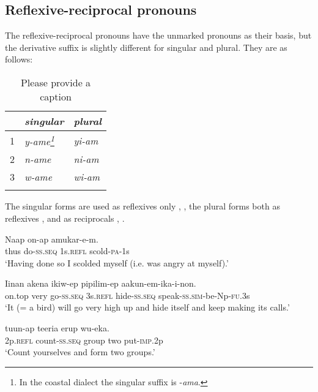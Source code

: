 \subsection{Reflexive-reciprocal pronouns}\label{sec:3.5.8}
{}
The reflexive-reciprocal pronouns have the unmarked pronouns as their basis, but the derivative suffix is slightly different for singular and plural. They are as follows:

\begin{table}
\caption{Please provide a caption}
 
\begin{tabular}{l>{\itshape}l>{\itshape}l}
\mytoprule
 &\upshape singular &\upshape plural\\
\midrule
1 &y-ame\footnote{In the coastal dialect the singular suffix is -\textit{ama}.} &yi-am\\
2 &n-ame &ni-am\\
3 &w-ame &wi-am\\
\mybottomrule
\end{tabular}
\end{table}


The singular forms are used as reflexives only , , the plural forms both as reflexives ,  and as reciprocals , .

\ea%
\label{ex:3:x610}
\gll Naap on-ap  amukar-e-m. \\
thus do-\textsc{ss}.\textsc{seq} 1s.\textsc{refl} scold-\textsc{pa}-1s\\
\glt`Having done so I scolded myself (i.e. was angry at myself).'
\z

\ea%
\label{ex:3:x1864}
\gll Iinan akena ikiw-ep  pipilim-ep aakun-em-ika-i-non.\\
on.top very go-\textsc{ss}.\textsc{seq} 3s.\textsc{refl} hide-\textsc{ss}.\textsc{seq} speak-\textsc{ss}.\textsc{sim}-be-Np-\textsc{fu}.3s\\
\glt`It (= a bird) will go very high up and hide itself and keep making its calls.'
\z

\ea%
\label{ex:3:x611}
\gll {} tuun-ap teeria erup wu-eka. \\
2p.\textsc{refl} count-\textsc{ss}.\textsc{seq} group two put-\textsc{imp}.2p\\
\glt`Count yourselves and form two groups.'
\z

